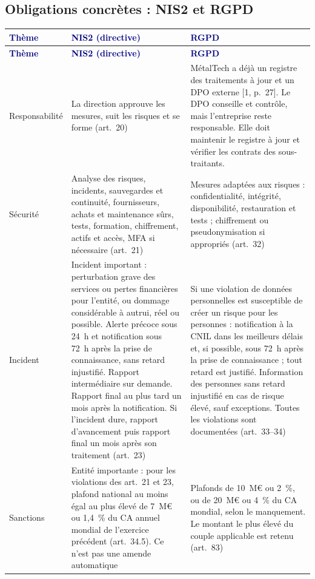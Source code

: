 \documentclass[11pt,a4paper]{article}
\newcommand{\thd}[1]{\textbf{\textcolor{navy}{#1}}}
\newcommand{\figsource}[1]{\par\vspace{-2pt}{\RaggedRight\footnotesize\textcolor{graytext}{#1}\par}}
\begin{document}
\subsection*{Obligations concrètes : NIS2 et RGPD}
\begin{xltabular}{\linewidth}{@{}P{24mm}YY@{}}\toprule
\thd{Thème} & \thd{NIS2 (directive)} & \thd{RGPD}\\\midrule\endfirsthead
\toprule \thd{Thème} & \thd{NIS2 (directive)} & \thd{RGPD}\\\midrule\endhead
\bottomrule\endfoot
Responsabilité & La direction approuve les mesures, suit les risques et se forme (art.~20) & MétalTech a déjà un registre des traitements à jour et un DPO externe [1, p.~27]. Le DPO conseille et contrôle, mais l'entreprise reste responsable. Elle doit maintenir le registre à jour et vérifier les contrats des sous-traitants.\\
Sécurité & Analyse des risques, incidents, sauvegardes et continuité, fournisseurs, achats et maintenance sûrs, tests, formation, chiffrement, actifs et accès, MFA si nécessaire (art.~21) & Mesures adaptées aux risques : confidentialité, intégrité, disponibilité, restauration et tests ; chiffrement ou pseudonymisation si appropriés (art.~32)\\
Incident & Incident important : perturbation grave des services ou pertes financières pour l'entité, ou dommage considérable à autrui, réel ou possible. Alerte précoce sous 24~h et notification sous 72~h après la prise de connaissance, sans retard injustifié. Rapport intermédiaire sur demande. Rapport final au plus tard un mois après la notification. Si l'incident dure, rapport d'avancement puis rapport final un mois après son traitement (art.~23) & Si une violation de données personnelles est susceptible de créer un risque pour les personnes : notification à la CNIL dans les meilleurs délais et, si possible, sous 72~h après la prise de connaissance ; tout retard est justifié. Information des personnes sans retard injustifié en cas de risque élevé, sauf exceptions. Toutes les violations sont documentées (art.~33--34)\\
Sanctions & Entité importante : pour les violations des art.~21 et 23, plafond national au moins égal au plus élevé de 7~M€ ou 1,4~\% du CA annuel mondial de l'exercice précédent (art.~34.5). Ce n'est pas une amende automatique & Plafonds de 10~M€ ou 2~\%, ou de 20~M€ ou 4~\% du CA mondial, selon le manquement. Le montant le plus élevé du couple applicable est retenu (art.~83)\\
\end{xltabular}
\figsource{D'après la directive NIS2 [10], le RGPD [11] et la CNIL [12], consultés sur EUR-Lex et le site de la CNIL les 24 et 25/11/2026. Tout incident n'est pas à notifier à la CNIL : seulement les violations de données personnelles qui créent un risque. Les délais partent du moment où l'entreprise a connaissance de l'incident ou de la violation concernée. Pour NIS2, l'alerte et la notification vont au CSIRT ou à l'autorité compétente ; les modalités françaises dépendront de la loi de transposition. Le PCA et le PAR citent déjà l'ANSSI et son CSIRT [8, §7.3] [9, §8.1].}
\end{document}
